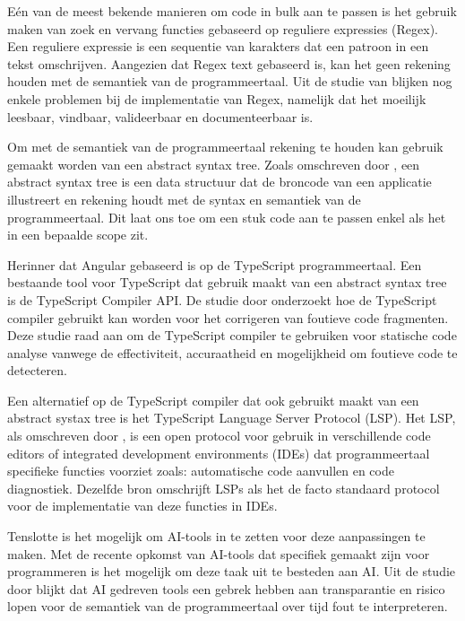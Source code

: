 Eén van de meest bekende manieren om code in bulk aan te passen is het gebruik maken van zoek en vervang functies gebaseerd op reguliere expressies (Regex).
Een reguliere expressie is een sequentie van karakters dat een patroon in een tekst omschrijven.
Aangezien dat Regex text gebaseerd is, kan het geen rekening houden met de semantiek van de programmeertaal.
Uit de studie van \textcite{Michael2019} blijken nog enkele problemen bij de implementatie van Regex, namelijk dat het moeilijk leesbaar, vindbaar, valideerbaar en documenteerbaar is.

Om met de semantiek van de programmeertaal rekening te houden kan gebruik gemaakt worden van een abstract syntax tree.
Zoals omschreven door \textcite{Sun2023}, een abstract syntax tree is een data structuur dat de broncode van een applicatie illustreert en rekening houdt met de syntax en semantiek van de programmeertaal.
Dit laat ons toe om een stuk code aan te passen enkel als het in een bepaalde scope zit.

Herinner dat Angular gebaseerd is op de TypeScript programmeertaal.
Een bestaande tool voor TypeScript dat gebruik maakt van een abstract syntax tree is de TypeScript Compiler API.
De studie door \textcite{Reid2023} onderzoekt hoe de TypeScript compiler gebruikt kan worden voor het corrigeren van foutieve code fragmenten. 
Deze studie raad aan om de TypeScript compiler te gebruiken voor statische code analyse vanwege de effectiviteit, accuraatheid en mogelijkheid om foutieve code te detecteren.

Een alternatief op de TypeScript compiler dat ook gebruikt maakt van een abstract systax tree is het TypeScript Language Server Protocol (LSP).
Het LSP, als omschreven door \textcite{Bork2023}, is een open protocol voor gebruik in verschillende code editors of integrated development environments (IDEs) dat programmeertaal specifieke functies voorziet zoals: automatische code aanvullen en code diagnostiek. 
Dezelfde bron omschrijft LSPs als het de facto standaard protocol voor de implementatie van deze functies in IDEs.

Tenslotte is het mogelijk om AI-tools in te zetten voor deze aanpassingen te maken.
Met de recente opkomst van AI-tools dat specifiek gemaakt zijn voor programmeren is het mogelijk om deze taak uit te besteden aan AI.
Uit de studie door \textcite{Hodovychenko2025} blijkt dat AI gedreven tools een gebrek hebben aan transparantie en risico lopen voor de semantiek van de programmeertaal over tijd fout te interpreteren.


